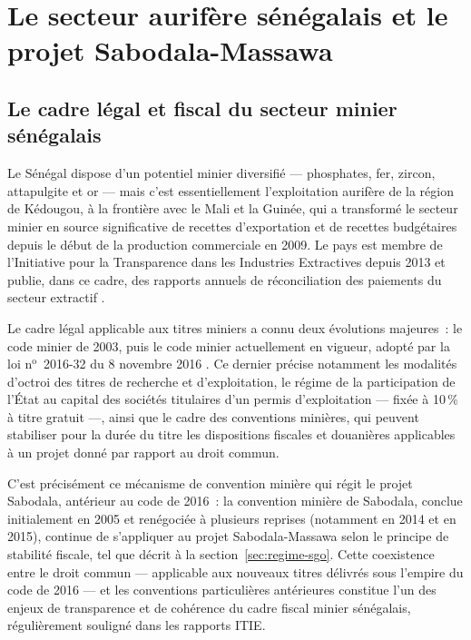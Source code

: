 \chapter{Le secteur aurifère sénégalais et le projet Sabodala-Massawa}
\label{chap:senegal}

\section{Le cadre légal et fiscal du secteur minier sénégalais}

Le Sénégal dispose d'un potentiel minier diversifié --- phosphates, fer, zircon, attapulgite et or --- mais c'est essentiellement l'exploitation aurifère de la région de Kédougou, à la frontière avec le Mali et la Guinée, qui a transformé le secteur minier en source significative de recettes d'exportation et de recettes budgétaires depuis le début de la production commerciale en 2009. Le pays est membre de l'Initiative pour la Transparence dans les Industries Extractives depuis 2013 et publie, dans ce cadre, des rapports annuels de réconciliation des paiements du secteur extractif \citep{eiti_senegal}.

Le cadre légal applicable aux titres miniers a connu deux évolutions majeures~: le code minier de 2003, puis le code minier actuellement en vigueur, adopté par la loi n$^\text{o}$~2016-32 du 8 novembre 2016 \citep{senegal2016codeminier}. Ce dernier précise notamment les modalités d'octroi des titres de recherche et d'exploitation, le régime de la participation de l'État au capital des sociétés titulaires d'un permis d'exploitation --- fixée à 10\,\% à titre gratuit ---, ainsi que le cadre des conventions minières, qui peuvent stabiliser pour la durée du titre les dispositions fiscales et douanières applicables à un projet donné par rapport au droit commun.

C'est précisément ce mécanisme de convention minière qui régit le projet Sabodala, antérieur au code de 2016~: la convention minière de Sabodala, conclue initialement en 2005 et renégociée à plusieurs reprises (notamment en 2014 et en 2015), continue de s'appliquer au projet Sabodala-Massawa selon le principe de stabilité fiscale, tel que décrit à la section~\ref{sec:regime-sgo}. Cette coexistence entre le droit commun --- applicable aux nouveaux titres délivrés sous l'empire du code de 2016 --- et les conventions particulières antérieures constitue l'un des enjeux de transparence et de cohérence du cadre fiscal minier sénégalais, régulièrement souligné dans les rapports ITIE.

